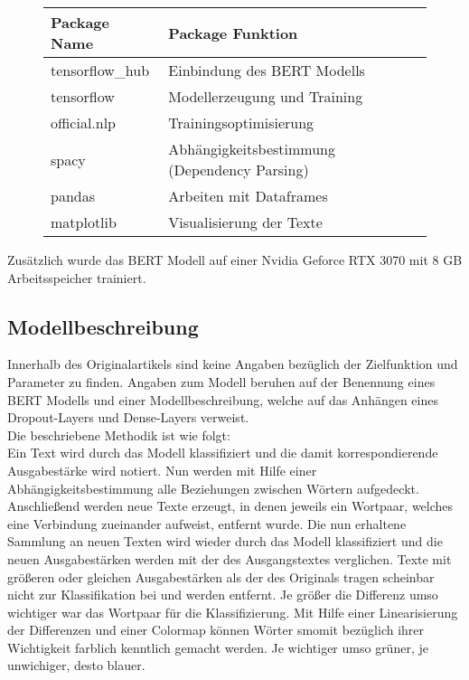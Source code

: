 \documentclass[DIV=13,fontsize=11pt]{scrartcl}
\begin{document}
\begin{figure}[H]
    \centering
    \begin{tabular}{ll}
        \toprule
        Package Name    & Package Funktion                             \\
        \midrule
        tensorflow\_hub & Einbindung des BERT Modells                  \\
        tensorflow      & Modellerzeugung und Training                 \\
        official.nlp    & Trainingsoptimisierung                       \\
        spacy           & Abhängigkeitsbestimmung (Dependency Parsing) \\
        pandas          & Arbeiten mit Dataframes                      \\
        matplotlib      & Visualisierung der Texte                     \\
        \bottomrule
    \end{tabular}
\end{figure}

Zusätzlich wurde das BERT Modell auf einer Nvidia Geforce RTX 3070 mit 8 GB Arbeitsspeicher
trainiert.

\subsection{Modellbeschreibung}

Innerhalb des Originalartikels sind keine Angaben bezüglich der Zielfunktion und
Parameter zu finden. Angaben zum Modell beruhen auf der Benennung eines BERT Modells und
einer Modellbeschreibung, welche auf das Anhängen eines Dropout-Layers und
Dense-Layers verweist.\\

Die beschriebene Methodik ist wie folgt:\\

Ein Text wird durch das Modell klassifiziert und die damit korrespondierende
Ausgabestärke wird notiert. Nun werden mit Hilfe einer Abhängigkeitsbestimmung
alle Beziehungen zwischen Wörtern aufgedeckt. Anschließend werden neue Texte
erzeugt, in denen jeweils ein Wortpaar, welches eine Verbindung zueinander
aufweist, entfernt wurde. Die nun erhaltene Sammlung an neuen Texten wird wieder
durch das Modell klassifiziert und die neuen Ausgabestärken werden mit der
des Ausgangstextes verglichen. Texte mit größeren oder gleichen Ausgabestärken
als der des Originals tragen scheinbar nicht zur Klassifikation bei und werden
entfernt. Je größer die Differenz umso wichtiger war das
Wortpaar für die Klassifizierung. Mit Hilfe einer Linearisierung der Differenzen
und einer Colormap können Wörter smomit bezüglich ihrer Wichtigkeit
farblich kenntlich gemacht werden. Je wichtiger umso grüner, je unwichiger, desto blauer.
\end{document}
